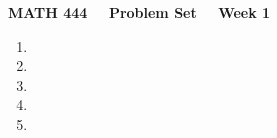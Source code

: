 \documentclass[12pt]{article}
\begin{document}
\centerline{\bf {\large MATH 444  \ \ Problem Set \ \  Week 1 }}


\begin{enumerate}
	\item 
	\item 
	\item 
	\item 
	\item %
\end{enumerate}
\end{document}
